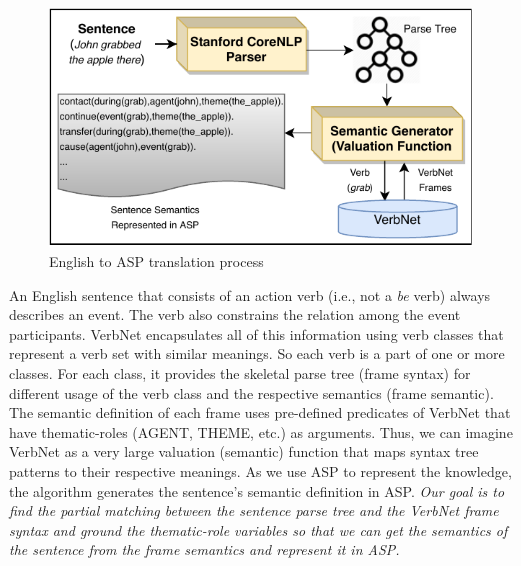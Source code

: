 \documentclass[letterpaper]{article}
\begin{document}
 

\begin{figure}[h]
    \centering
    \includegraphics[scale = 0.8]{semantic_algebra}
    \caption{English to ASP translation process }
    \label{fig:semantic_algebra}
    \end{figure}






An English sentence that consists of an action verb (i.e., not a \textit{be} verb) always describes an event. The verb also constrains the relation among the event participants. VerbNet encapsulates all of this information using verb classes that represent a verb set with similar meanings. So each verb is a part of one or more classes. For each class, it provides the skeletal parse tree (frame syntax) for different usage of the verb class and the respective semantics (frame semantic). The semantic definition of each frame uses pre-defined predicates of VerbNet that have thematic-roles (AGENT, THEME, etc.) as arguments. Thus, we can imagine VerbNet as a very large valuation (semantic) function that maps syntax tree patterns to their respective meanings. As we use ASP to represent the knowledge, the algorithm generates the sentence's semantic definition in ASP. \textit{Our goal is to find the partial matching between the sentence parse tree and the VerbNet frame syntax and ground the thematic-role variables so that we can get the semantics of the sentence from the frame semantics and represent it in ASP.} 
\end{document}
